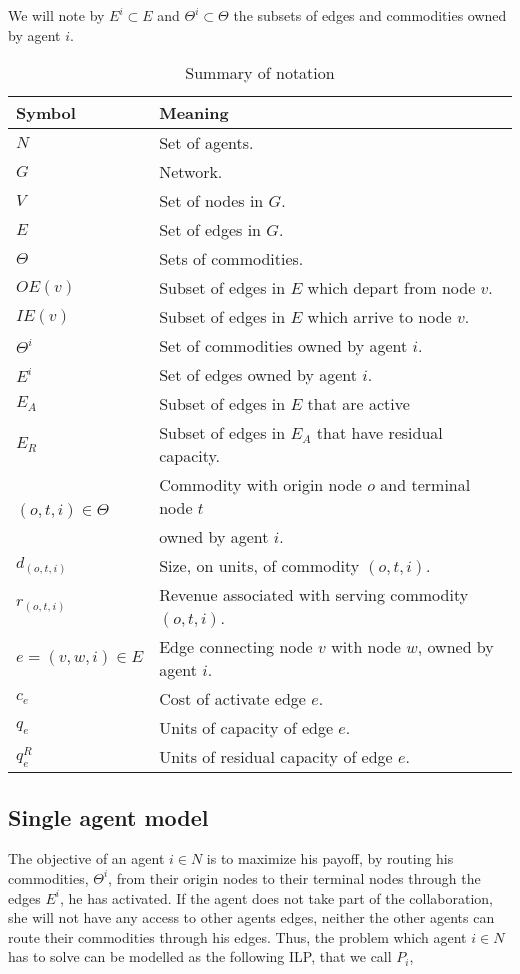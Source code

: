 \documentclass[review]{elsarticle}
\begin{document}
We will note by $E^i \subset E$ and $\Theta^i\subset \Theta$ the subsets of
edges and commodities owned by agent $i$.

\begin{table}[h!]
	\caption{Summary of notation \label{tb:notation}}
	\begin{tabular}{|l|l|}
	\hline
	Symbol & Meaning	 \\ \hline
	$N$ & Set of agents. \\
	$G$ & Network. \\
	$V$ & Set of nodes in $G$. \\
	$E$ & Set of edges in $G$. \\
	$\Theta$ & Sets of commodities. \\
	$OE(v)$ & Subset of edges in $E$ which depart from node $v$.\\
	$IE(v)$ & Subset of edges in $E$ which arrive to node $v$.\\	
	$\Theta^i$ & Set of commodities owned by agent $i$. \\	
	$E^i$ & Set of edges owned by agent $i$.\\
	$E_A$ & Subset of edges in $E$ that are active \\
	$E_R$ & Subset of edges in $E_A$ that have residual capacity.\\
	\multirow{2}{*}{$(o,t,i)\in \Theta$} & Commodity with origin node $o$ and terminal node $t$\\[-3pt]
	& owned by agent $i$. \\
	$d_{(o,t,i)}$ & Size, on units, of commodity $(o,t,i)$.\\
	$r_{(o,t,i)}$ & Revenue associated with serving commodity $(o,t,i)$.\\
	$e=(v,w,i)\in E$ & Edge connecting node $v$ with node $w$, owned by agent $i$.\\
	$c_e$ & Cost of activate edge $e$. \\
	$q_e$ & Units of capacity of edge $e$. \\
	$q_e^R$ & Units of residual capacity of edge $e$.\\
	\hline
	\end{tabular}
\end{table}

\subsection{Single agent model}

The objective of an agent $i \in N$ is to maximize his payoff, by routing his
commodities, $\Theta^i$, from their origin nodes to their terminal nodes through the edges $E^i$, he has activated. If the agent does not take part of the collaboration, she will not have any access to other agents edges, neither the other agents can route their commodities through his edges. Thus, the problem which agent $i\in N$ has to solve can be modelled as the following ILP, that we call $P_i$,
\end{document}
